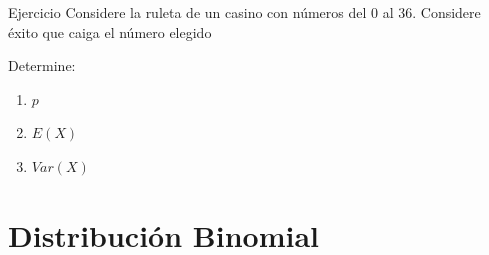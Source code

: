 \documentclass[11pt]{beamer}
\begin{document}
\begin{frame}{Ejercicio}
Considere la ruleta de un casino con n\'umeros del 0 al 36. Considere éxito que caiga el número elegido

\bigskip
Determine:

\begin{enumerate}
  \item $p$
  \item $E(X)$
  \item $Var(X)$
\end{enumerate}
\end{frame}

\section{Distribución Binomial}
\end{document}
